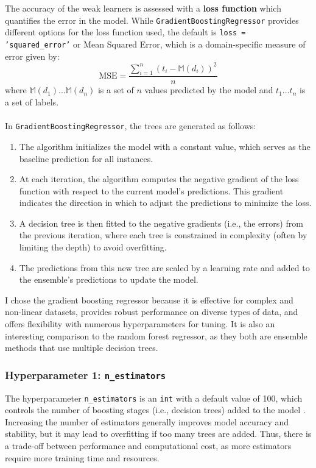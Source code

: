 \documentclass[a4paper]{article}
\begin{document}
The accuracy of the weak learners is assessed with a \textbf{loss function} which quantifies the error in the model.
While \texttt{GradientBoostingRegressor} provides different options for the loss function used, the default is \texttt{loss = 'squared_error'} or Mean Squared Error, which is a domain-specific measure of error given by:
\[
    \text{MSE} = \frac{ \sum^n_{i=1} ( t_i - \mathbb{M}(d_i) )^2 }{ n }
\]
where $\mathbb{M}(d_1) \dots \mathbb{M}(d_n)$ is a set of $n$ values predicted by the model and $t_1 \dots t_n$ is a set of labels. \supercite{glavo}
\\\\
In \texttt{GradientBoostingRegressor}, the trees are generated as follows:
\begin{enumerate}
    \item   The algorithm initializes the model with a constant value, which serves as the baseline prediction for all instances.

    \item   At each iteration, the algorithm computes the negative gradient of the loss function with respect to the current model's predictions. 
            This gradient indicates the direction in which to adjust the predictions to minimize the loss.

    \item   A decision tree is then fitted to the negative gradients (i.e., the errors) from the previous iteration, where each tree is constrained in complexity (often by limiting the depth) to avoid overfitting.

    \item   The predictions from this new tree are scaled by a learning rate and added to the ensemble's predictions to update the model.
\end{enumerate}

I chose the gradient boosting regressor because it is effective for complex and non-linear datasets, provides robust performance on diverse types of data, and offers flexibility with numerous hyperparameters for tuning.
It is also an interesting comparison to the random forest regressor, as they both are ensemble methods that use multiple decision trees.

\subsubsection{Hyperparameter 1: \texttt{n_estimators}}
The hyperparameter \texttt{n_estimators} is an \texttt{int} with a default value of 100, which controls the number of boosting stages (i.e., decision trees) added to the model \supercite{scikit_gradientboostingregressor}. 
Increasing the number of estimators generally improves model accuracy and stability, but it may lead to overfitting if too many trees are added. 
Thus, there is a trade-off between performance and computational cost, as more estimators require more training time and resources.
\end{document}
